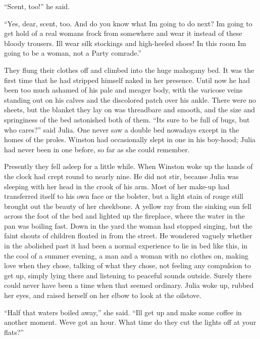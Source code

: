 ``Scent, too!'' he said.

``Yes, dear, scent, too. And do you know what I\textquotesingle m going
to do next? I\textquotesingle m going to get hold of a real
woman\textquotesingle s frock from somewhere and wear it instead of
these bloody trousers. I\textquotesingle ll wear silk stockings and
high-heeled shoes! In this room I\textquotesingle m going to be a woman,
not a Party comrade.''

They flung their clothes off and climbed into the huge mahogany bed. It
was the first time that he had stripped himself naked in her presence.
Until now he had been too much ashamed of his pale and meager body, with
the varicose veins standing out on his calves and the discolored patch
over his ankle. There were no sheets, but the blanket they lay on was
threadbare and smooth, and the size and springiness of the bed
astonished both of them. ``It\textquotesingle s sure to be full of bugs,
but who cares?'' said Julia. One never saw a double bed nowadays except
in the homes of the proles. Winston had occasionally slept in one in his
boy-hood; Julia had never been in one before, so far as she could
remember.

Presently they fell asleep for a little while. When Winston woke up the
hands of the clock had crept round to nearly nine. He did not stir,
because Julia was sleeping with her head in the crook of his arm. Most
of her make-up had transferred itself to his own face or the bolster,
but a light stain of rouge still brought out the beauty of her
cheekbone. A yellow ray from the sinking sun fell across the foot of the
bed and lighted up the fireplace, where the water in the pan was boiling
fast. Down in the yard the woman had stopped singing, but the faint
shouts of children floated in from the street. He wondered vaguely
whether in the abolished past it had been a normal experience to lie in
bed like this, in the cool of a summer evening, a man and a woman with
no clothes on, making love when they chose, talking of what they chose,
not feeling any compulsion to get up, simply lying there and listening
to peaceful sounds outside. Surely there could never have been a time
when that seemed ordinary. Julia woke up, rubbed her eyes, and raised
herself on her elbow to look at the oilstove.

``Half that water\textquotesingle s boiled away,'' she said.
``I\textquotesingle ll get up and make some coffee in another moment.
We\textquotesingle ve got an hour. What time do they cut the lights off
at your flats?''

